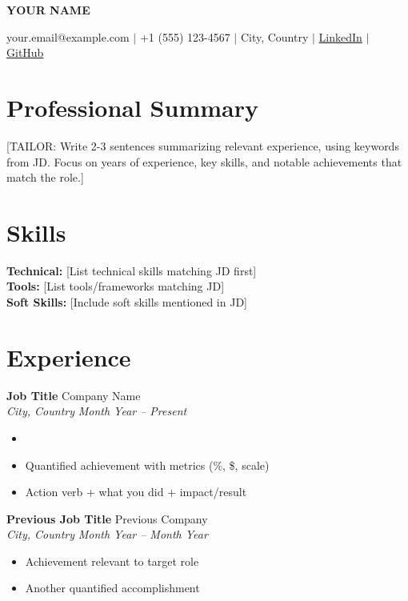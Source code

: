 \documentclass[11pt,a4paper]{article}
\newcommand{\name}[1]{\centerline{\Huge\bfseries #1}\vspace{4pt}}
\newcommand{\contact}[1]{\centerline{#1}\vspace{8pt}}
\newcommand{\jobtitle}[4]{
    \textbf{#1} \hfill #2 \\
    \textit{#3} \hfill \textit{#4}
    \vspace{-4pt}
}
\begin{document}
\name{YOUR NAME}
\contact{
    your.email@example.com $\vert$
    +1 (555) 123-4567 $\vert$
    City, Country $\vert$
    \href{https://linkedin.com/in/yourprofile}{LinkedIn} $\vert$
    \href{https://github.com/yourusername}{GitHub}
}

\section{Professional Summary}
[TAILOR: Write 2-3 sentences summarizing relevant experience, using keywords from JD. Focus on years of experience, key skills, and notable achievements that match the role.]

\section{Skills}
\textbf{Technical:} [List technical skills matching JD first] \\
\textbf{Tools:} [List tools/frameworks matching JD] \\
\textbf{Soft Skills:} [Include soft skills mentioned in JD]

\section{Experience}

\jobtitle{Job Title}{Company Name}{City, Country}{Month Year -- Present}
\begin{itemize}
    \item [TAILOR: Lead with accomplishment most relevant to target JD]
    \item Quantified achievement with metrics (\%, \$, scale)
    \item Action verb + what you did + impact/result
\end{itemize}

\jobtitle{Previous Job Title}{Previous Company}{City, Country}{Month Year -- Month Year}
\begin{itemize}
    \item Achievement relevant to target role
    \item Another quantified accomplishment
\end{itemize}
\end{document}
